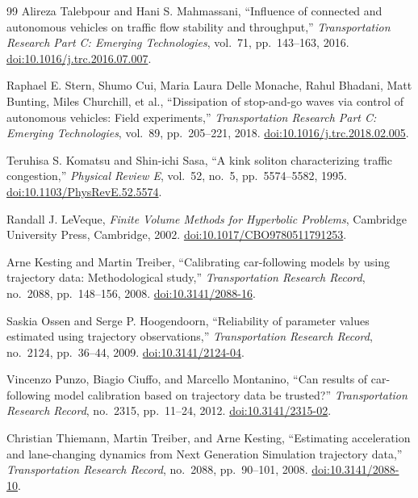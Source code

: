 \documentclass[11pt,a4paper,openany]{book}
\numberwithin{equation}{chapter}
\numberwithin{figure}{chapter}
\numberwithin{table}{chapter}
\begin{document}
\begin{thebibliography}{99}
Alireza Talebpour and Hani S. Mahmassani,
``Influence of connected and autonomous vehicles on traffic flow stability and throughput,''
\emph{Transportation Research Part C: Emerging Technologies}, vol.~71, pp.~143--163, 2016.
\href{https://doi.org/10.1016/j.trc.2016.07.007}{doi:10.1016/j.trc.2016.07.007}.

Raphael E. Stern, Shumo Cui, Maria Laura Delle Monache, Rahul Bhadani,
Matt Bunting, Miles Churchill, et al.,
``Dissipation of stop-and-go waves via control of autonomous vehicles: Field experiments,''
\emph{Transportation Research Part C: Emerging Technologies}, vol.~89, pp.~205--221, 2018.
\href{https://doi.org/10.1016/j.trc.2018.02.005}{doi:10.1016/j.trc.2018.02.005}.

Teruhisa S. Komatsu and Shin-ichi Sasa,
``A kink soliton characterizing traffic congestion,''
\emph{Physical Review E}, vol.~52, no.~5, pp.~5574--5582, 1995.
\href{https://doi.org/10.1103/PhysRevE.52.5574}{doi:10.1103/PhysRevE.52.5574}.

Randall J. LeVeque,
\emph{Finite Volume Methods for Hyperbolic Problems},
Cambridge University Press, Cambridge, 2002.
\href{https://doi.org/10.1017/CBO9780511791253}{doi:10.1017/CBO9780511791253}.

Arne Kesting and Martin Treiber,
``Calibrating car-following models by using trajectory data: Methodological study,''
\emph{Transportation Research Record}, no.~2088, pp.~148--156, 2008.
\href{https://doi.org/10.3141/2088-16}{doi:10.3141/2088-16}.

Saskia Ossen and Serge P. Hoogendoorn,
``Reliability of parameter values estimated using trajectory observations,''
\emph{Transportation Research Record}, no.~2124, pp.~36--44, 2009.
\href{https://doi.org/10.3141/2124-04}{doi:10.3141/2124-04}.

Vincenzo Punzo, Biagio Ciuffo, and Marcello Montanino,
``Can results of car-following model calibration based on trajectory data be trusted?''
\emph{Transportation Research Record}, no.~2315, pp.~11--24, 2012.
\href{https://doi.org/10.3141/2315-02}{doi:10.3141/2315-02}.

Christian Thiemann, Martin Treiber, and Arne Kesting,
``Estimating acceleration and lane-changing dynamics from Next Generation Simulation trajectory data,''
\emph{Transportation Research Record}, no.~2088, pp.~90--101, 2008.
\href{https://doi.org/10.3141/2088-10}{doi:10.3141/2088-10}.


\end{thebibliography}
\end{document}
